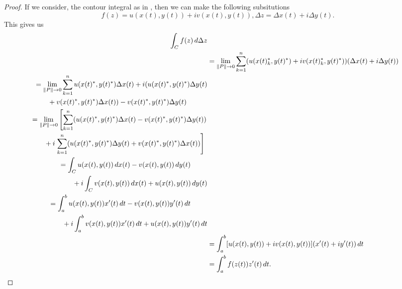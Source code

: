 \documentclass[12pt]{book}
\begin{document}
\begin{proof}
    If we consider, the contour integral as in , then we can make the following subsitutions 
    \[
        f(z) = u(x(t), y(t)) + iv(x(t), y(t)), \Delta z = \Delta x(t) + i\Delta y(t).
    \]
    This gives us
    \begin{align*}
        \int_{C} f(z)\,d\Delta z \\
            &=    
                \lim_{\left\lVert P \right\rVert \rightarrow 0} \sum_{k = 1}^{n}(u(x(t)_{k}^{*}, y(t)^{*}) + iv(x(t)_{k}^{*}, y(t)^{*}))(\Delta x(t) + i\Delta y(t)) \\
        \begin{split}
            &=
                \lim_{\left\lVert P \right\rVert \rightarrow 0} \sum_{k = 1}^{n}u(x(t)^{*}, y(t)^{*})\Delta x(t) + i(u(x(t)^{*}, y(t)^{*})\Delta y(t) \\
            &\qquad+ 
                v(x(t)^{*}, y(t)^{*})\Delta x(t)) - v(x(t)^{*}, y(t)^{*})\Delta y(t) \\
        \end{split}
        \\
        \begin{split}
            &=
                \lim_{\left\lVert P \right\rVert \rightarrow 0} \left[\sum_{k = 1}^{n}(u(x(t)^{*}, y(t)^{*})\Delta x(t) - v(x(t)^{*}, y(t)^{*})\Delta y(t))\right. \\
            &\qquad+ 
                i\left.\sum_{k = 1}^{n} (u(x(t)^{*}, y(t)^{*})\Delta y(t) + v(x(t)^{*}, y(t)^{*})\Delta x(t))\right] \\
        \end{split}
        \\
        \begin{split}
            &=
                \int_{C} u(x(t), y(t))\,dx(t) -v(x(t), y(t))\,dy(t) \\
            &\qquad+ 
                i\int_{C} v(x(t), y(t))\,dx(t) + u(x(t), y(t))\,dy(t) \\
        \end{split}
        \\
        \begin{split}
            &=
                \int_{a}^{b} u(x(t), y(t))x'(t)\,dt -v(x(t), y(t))y'(t)\,dt \\
            &\qquad+ 
                i\int_{a}^{b} v(x(t), y(t))x'(t)\,dt + u(x(t), y(t))y'(t)\,dt \\
        \end{split}
        \\
            &=
                \int_{a}^{b} [u(x(t), y(t)) + iv(x(t), y(t))](x'(t) + iy'(t))\,dt \\
            &=
                \int_{a}^{b} f(z(t))z'(t)\,dt.
    \end{align*}
\end{proof}
\end{document}
